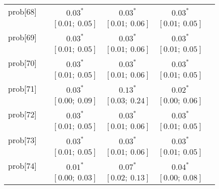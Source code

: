 \begin{table}
\begin{center}
\begin{tabular}{l c c c c c }
prob[68]    &                                  & $0.03^{*}$                & $0.03^{*}$                & $0.03^{*}$              &                         \\
            &                                  & $[0.01;\ 0.05]$           & $[0.01;\ 0.06]$           & $[0.01;\ 0.05]$         &                         \\
prob[69]    &                                  & $0.03^{*}$                & $0.03^{*}$                & $0.03^{*}$              &                         \\
            &                                  & $[0.01;\ 0.05]$           & $[0.01;\ 0.06]$           & $[0.01;\ 0.05]$         &                         \\
prob[70]    &                                  & $0.03^{*}$                & $0.03^{*}$                & $0.03^{*}$              &                         \\
            &                                  & $[0.01;\ 0.05]$           & $[0.01;\ 0.06]$           & $[0.01;\ 0.05]$         &                         \\
prob[71]    &                                  & $0.03^{*}$                & $0.13^{*}$                & $0.02^{*}$              &                         \\
            &                                  & $[0.00;\ 0.09]$           & $[0.03;\ 0.24]$           & $[0.00;\ 0.06]$         &                         \\
prob[72]    &                                  & $0.03^{*}$                & $0.03^{*}$                & $0.03^{*}$              &                         \\
            &                                  & $[0.01;\ 0.05]$           & $[0.01;\ 0.06]$           & $[0.01;\ 0.05]$         &                         \\
prob[73]    &                                  & $0.03^{*}$                & $0.03^{*}$                & $0.03^{*}$              &                         \\
            &                                  & $[0.01;\ 0.05]$           & $[0.01;\ 0.06]$           & $[0.01;\ 0.05]$         &                         \\
prob[74]    &                                  & $0.01^{*}$                & $0.07^{*}$                & $0.04^{*}$              &                         \\
            &                                  & $[0.00;\ 0.03]$           & $[0.02;\ 0.13]$           & $[0.00;\ 0.08]$         &                         \\

\end{tabular}
\end{center}
\end{table}
